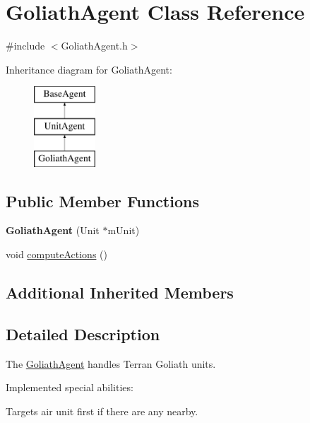 \hypertarget{class_goliath_agent}{\section{Goliath\-Agent Class Reference}
\label{class_goliath_agent}
}


{\ttfamily \#include $<$Goliath\-Agent.\-h$>$}

Inheritance diagram for Goliath\-Agent\-:\begin{figure}[H]
\begin{center}
\leavevmode
\includegraphics[height=3.000000cm]{class_goliath_agent}
\end{center}
\end{figure}
\subsection*{Public Member Functions}
\begin{DoxyCompactItemize}
\item 
\hypertarget{class_goliath_agent_ad557d45944771bf49d23c75e2045fbe6}{{\bfseries Goliath\-Agent} (Unit $\ast$m\-Unit)}\label{class_goliath_agent_ad557d45944771bf49d23c75e2045fbe6}

\item 
void \hyperlink{class_goliath_agent_a594e35f31718d61aa400036b66afa7b8}{compute\-Actions} ()
\end{DoxyCompactItemize}
\subsection*{Additional Inherited Members}


\subsection{Detailed Description}
The \hyperlink{class_goliath_agent}{Goliath\-Agent} handles Terran Goliath units.

Implemented special abilities\-:
\begin{DoxyItemize}
\item Targets air unit first if there are any nearby.
\end{DoxyItemize}

